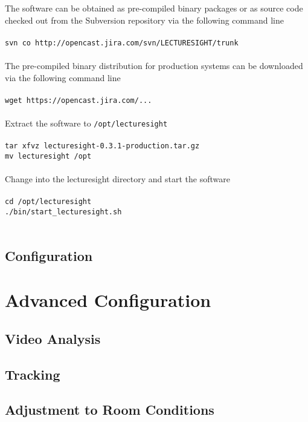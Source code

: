 \documentclass[a4paper,10pt]{book}
\begin{document}
The software can be obtained as pre-compiled binary packages or as source code checked out from the Subversion repository via the following command line
\\~\\
\texttt{svn co http://opencast.jira.com/svn/LECTURESIGHT/trunk}
\\~\\
The pre-compiled binary distribution for production systems can be downloaded via the following command line
\\~\\
\texttt{wget https://opencast.jira.com/...}
\\~\\
Extract the software to \texttt{/opt/lecturesight}
\\~\\
\texttt{tar xfvz lecturesight-0.3.1-production.tar.gz}\\
\texttt{mv lecturesight /opt}
\\~\\
Change into the lecturesight directory and start the software
\\~\\
\texttt{cd /opt/lecturesight}\\
\texttt{./bin/start\_lecturesight.sh}
\\~\\


\subsection{Configuration}

\section{Advanced Configuration}

\subsection{Video Analysis}

\subsection{Tracking}

\subsection{Adjustment to Room Conditions}
\end{document}
